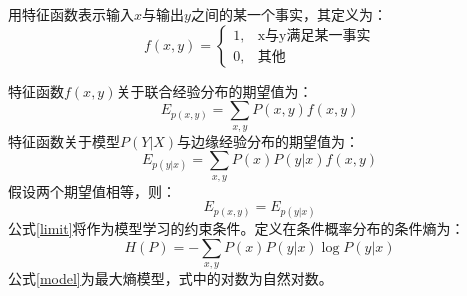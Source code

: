\documentclass{article}
\begin{document}
	\noindent 用特征函数表示输入$x$与输出$y$之间的某一个事实，其定义为：
	\begin{equation}
	f(x,y)=\begin{cases}
	1 , & \text{x与y满足某一事实}\\
	0,&\text{其他}
	\end{cases}
	\end{equation}
	
	\noindent 特征函数$f(x,y)$关于联合经验分布的期望值为：
	\begin{equation}
	E_{p\left ( x,y \right )}=\sum_{x,y}P\left ( x,y \right )f\left ( x,y \right )
	\end{equation}
	特征函数关于模型$P(Y|X)$与边缘经验分布的期望值为：
	\begin{equation}
	E_{p\left ( y|x \right )}=\sum_{x,y}P\left ( x \right )P\left ( y|x \right )f\left ( x,y \right )
	\end{equation}
	假设两个期望值相等，则：
	\begin{equation}
		E_{p\left ( x,y \right )}=E_{p\left ( y|x \right )}
		\label{limit}
	\end{equation}
	公式\ref{limit}将作为模型学习的约束条件。定义在条件概率分布的条件熵为：
	\begin{equation}
	H\left ( P \right )=-\sum _{x,y}P\left ( x \right )P\left ( y|x \right )\log P\left ( y|x \right )
	\label{model}
	\end{equation}
	公式\ref{model}为最大熵模型，式中的对数为自然对数。
\end{document}
